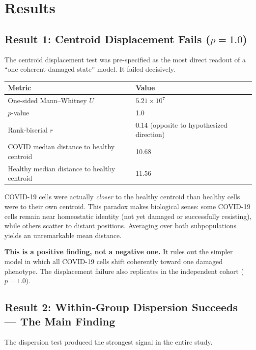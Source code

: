 \documentclass[11pt]{article}
\begin{document}
\section{Results}

\subsection{Result 1: Centroid Displacement Fails ($p = 1.0$)}

The centroid displacement test was pre-specified as the most direct readout of a ``one coherent damaged state'' model. It failed decisively.

\begin{center}
\small
\begin{tabular}{ll}
\toprule
Metric & Value \\
\midrule
One-sided Mann--Whitney $U$ & $5.21 \times 10^7$ \\
$p$-value & 1.0 \\
Rank-biserial $r$ & 0.14 (opposite to hypothesized direction) \\
COVID median distance to healthy centroid & 10.68 \\
Healthy median distance to healthy centroid & 11.56 \\
\bottomrule
\end{tabular}
\end{center}

COVID-19 cells were actually \emph{closer} to the healthy centroid than healthy cells were to their own centroid. This paradox makes biological sense: some COVID-19 cells remain near homeostatic identity (not yet damaged or successfully resisting), while others scatter to distant positions. Averaging over both subpopulations yields an unremarkable mean distance.

\textbf{This is a positive finding, not a negative one.} It rules out the simpler model in which all COVID-19 cells shift coherently toward one damaged phenotype. The displacement failure also replicates in the independent cohort ($p = 1.0$).

\subsection{Result 2: Within-Group Dispersion Succeeds --- The Main Finding}

The dispersion test produced the strongest signal in the entire study.
\end{document}
